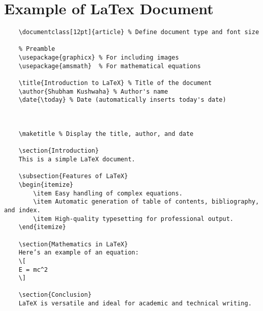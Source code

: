 \section*{Example of LaTex Document}
\begin{verbatim}
    \documentclass[12pt]{article} % Define document type and font size

    % Preamble
    \usepackage{graphicx} % For including images
    \usepackage{amsmath}  % For mathematical equations

    \title{Introduction to LaTeX} % Title of the document
    \author{Shubham Kushwaha} % Author's name
    \date{\today} % Date (automatically inserts today's date)

    

    \maketitle % Display the title, author, and date

    \section{Introduction}
    This is a simple LaTeX document.

    \subsection{Features of LaTeX}
    \begin{itemize}
        \item Easy handling of complex equations.
        \item Automatic generation of table of contents, bibliography, and index.
        \item High-quality typesetting for professional output.
    \end{itemize}

    \section{Mathematics in LaTeX}
    Here’s an example of an equation:
    \[
    E = mc^2
    \]

    \section{Conclusion}
    LaTeX is versatile and ideal for academic and technical writing.

    
\end{verbatim}
